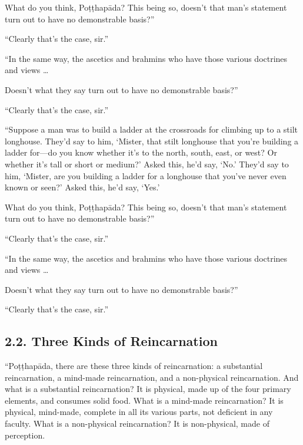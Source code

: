 \documentclass[12pt,openany]{book}%
\begin{document}
What do you think, \textsanskrit{Poṭṭhapāda}? This being so, doesn’t that man’s statement turn out to have no demonstrable basis?” 

“Clearly that’s the case, sir.” 

“In the same way, the ascetics and brahmins who have those various doctrines and views … 

Doesn’t what they say turn out to have no demonstrable basis?” 

“Clearly that’s the case, sir.” 

“Suppose a man was to build a ladder at the crossroads for climbing up to a stilt longhouse. They’d say to him, ‘Mister, that stilt longhouse that you’re building a ladder for—do you know whether it’s to the north, south, east, or west? Or whether it’s tall or short or medium?’ Asked this, he’d say, ‘No.’ They’d say to him, ‘Mister, are you building a ladder for a longhouse that you’ve never even known or seen?’ Asked this, he’d say, ‘Yes.’ 

What do you think, \textsanskrit{Poṭṭhapāda}? This being so, doesn’t that man’s statement turn out to have no demonstrable basis?” 

“Clearly that’s the case, sir.” 

“In the same way, the ascetics and brahmins who have those various doctrines and views … 

Doesn’t what they say turn out to have no demonstrable basis?” 

“Clearly that’s the case, sir.” 

\subsection*{2.2. Three Kinds of Reincarnation }

“\textsanskrit{Poṭṭhapāda}, there are these three kinds of reincarnation: a substantial reincarnation, a mind-made reincarnation, and a non-physical reincarnation. And what is a substantial reincarnation? It is physical, made up of the four primary elements, and consumes solid food. What is a mind-made reincarnation? It is physical, mind-made, complete in all its various parts, not deficient in any faculty. What is a non-physical reincarnation? It is non-physical, made of perception. 
\end{document}
